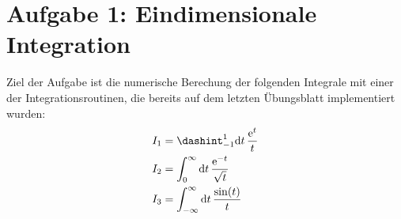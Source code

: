 



\maketitle

\section*{Aufgabe 1: Eindimensionale Integration}
Ziel der Aufgabe ist die numerische Berechung der folgenden Integrale mit einer der Integrationsroutinen,
die bereits auf dem letzten Übungsblatt implementiert wurden:
\begin{align*}
	I_1 &= \dashint_{-1}^{1} \text{d} t \,\frac{\text{e}^{t}}{t} \\
	I_2 &= \int_0^{\infty} \text{d} t \, \frac{\text{e}^{-t}}{\sqrt{t}} \\
  I_3 &= \int_{-\infty}^{\infty} \text{d} t \, \frac{\sin (t)}{t}
\end{align*}
\noindent

